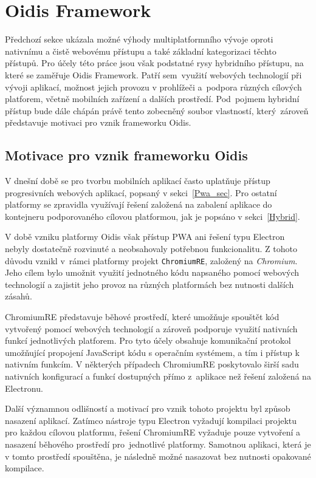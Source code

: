 \section{Oidis Framework}
\label{OidisFramework}

Předchozí sekce ukázala možné výhody multiplatformního vývoje oproti nativnímu a čistě webovému přístupu a také základní kategorizaci těchto přístupů. Pro účely této práce jsou však podstatné rysy hybridního přístupu, na které se zaměřuje Oidis Framework. Patří sem~využití webových technologií při vývoji aplikací, možnost jejich provozu v prohlížeči a~podpora různých cílových platforem, včetně mobilních zařízení a dalších prostředí. Pod~pojmem hybridní přístup bude dále chápán právě tento zobecněný soubor vlastností, který~zároveň představuje motivaci pro vznik frameworku Oidis. 

\subsection{Motivace pro vznik frameworku Oidis}
V dnešní době se pro tvorbu mobilních aplikací často uplatňuje přístup progresivních webových aplikací, popsaný v sekci~\ref{Pwa_sec}. Pro ostatní platformy se zpravidla využívají řešení založená na zabalení aplikace do kontejneru podporovaného cílovou platformou, jak je popsáno v sekci~\ref{Hybrid}.

V době vzniku platformy Oidis však přístup PWA ani řešení typu Electron nebyly dostatečně rozvinuté a neobsahovaly potřebnou funkcionalitu. Z tohoto důvodu vznikl v~rámci platformy projekt \texttt{ChromiumRE}, založený na \textit{Chromium}. Jeho cílem bylo umožnit využití jednotného kódu napsaného pomocí webových technologií a zajistit jeho provoz na různých platformách bez nutnosti dalších zásahů.

ChromiumRE představuje běhové prostředí, které umožňuje spouštět kód vytvořený pomocí webových technologií a zároveň podporuje využití nativních funkcí jednotlivých platforem. Pro tyto účely obsahuje komunikační protokol umožňující propojení JavaScript kódu s operačním systémem, a tím i přístup k nativním funkcím. V některých případech ChromiumRE poskytovalo širší sadu nativních konfigurací a funkcí dostupných přímo z~aplikace než řešení založená na Electronu.

Další významnou odlišností a motivací pro vznik tohoto projektu byl způsob nasazení aplikací. Zatímco nástroje typu Electron vyžadují kompilaci projektu pro každou cílovou platformu, řešení ChromiumRE vyžaduje pouze vytvoření a nasazení běhového prostředí pro~jednotlivé platformy. Samotnou aplikaci, která je v tomto prostředí spouštěna, je následně možné nasazovat bez nutnosti opakované kompilace.

